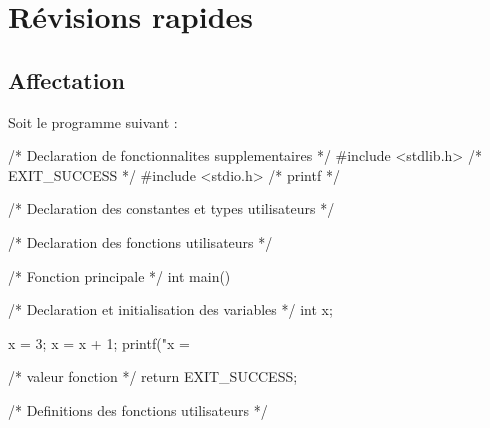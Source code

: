 
\newcommand{\commentaire}[1]{}




\section{Révisions rapides}

\subsection{Affectation}
Soit le programme suivant :
{\small
\begin{listing}{1}
/* Declaration de fonctionnalites supplementaires */
#include <stdlib.h> /* EXIT_SUCCESS */
#include <stdio.h> /* printf */

/* Declaration des constantes et types utilisateurs */

/* Declaration des fonctions utilisateurs */

/* Fonction principale */
int main()
{
    /* Declaration et initialisation des variables */
    int x;

    x = 3;
    x = x + 1;
    printf("x = %

    /* valeur fonction */
    return EXIT_SUCCESS;
}

/* Definitions des fonctions utilisateurs */
\end{listing}
}

